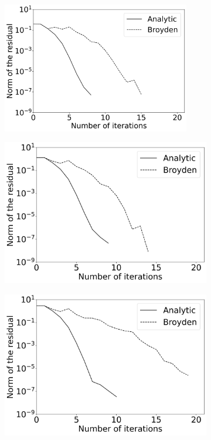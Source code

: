 \documentclass{report}
\begin{document}
 \begin{figure}[H]
 	\centering
 	\begin{subfigure}{0.32\textwidth}
 		\centering
 		\includegraphics[width=0.9\textwidth]{images/NewtonIterationConvergence5Elements.png}
 	\end{subfigure} 
 	\begin{subfigure}{0.32\textwidth}
 		\centering
 		\includegraphics[width=1\textwidth]{images/NewtonIterationConvergence40Elements.png}
 	\end{subfigure}
 	\begin{subfigure}{0.32\textwidth}
 		\centering
 		\includegraphics[width=1\textwidth]{images/NewtonIterationConvergence200Elements.png}

\end{subfigure}
\end{figure}
\end{document}
